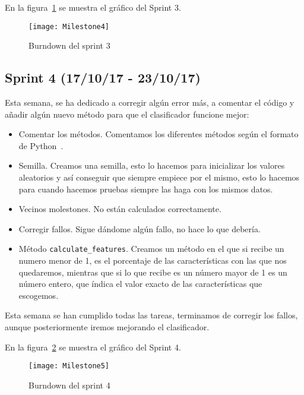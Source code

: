En la figura~\ref{fig:Milestone4} se muestra el gráfico del Sprint 3.

\begin{figure}
\centering
\texttt{[image: Milestone4]}
\caption{Burndown del sprint 3}
\label{fig:Milestone4}
\end{figure}

\subsection{Sprint 4 (17/10/17 - 23/10/17)}
Esta semana, se ha dedicado a corregir algún error más, a comentar el código y añadir algún nuevo método para que el clasificador funcione mejor:
\begin{itemize}
\item Comentar los métodos. Comentamos los diferentes métodos según el formato de Python~\cite{comment}.
\item Semilla. Creamos una semilla, esto lo hacemos para inicializar los valores aleatorios y así conseguir que siempre empiece por el mismo, esto lo hacemos para cuando hacemos pruebas siempre las haga con los mismos datos.
\item Vecinos molestones. No están calculados correctamente.
\item Corregir fallos. Sigue dándome algún fallo, no hace lo que debería.
\item Método \texttt{calculate\_features}. Creamos un método en el que si recibe un numero menor de 1, es el porcentaje de las características con las que nos quedaremos, mientras que si lo que recibe es un número mayor de 1 es un número entero, que índica el valor exacto de las características que escogemos.
\end{itemize}

Esta semana se han cumplido todas las tareas, terminamos de corregir los fallos, aunque posteriormente iremos mejorando el clasificador.

En la figura~\ref{fig:Milestone5} se muestra el gráfico del Sprint 4.

\begin{figure}
\centering
\texttt{[image: Milestone5]}
\caption{Burndown del sprint 4}
\label{fig:Milestone5}
\end{figure}

